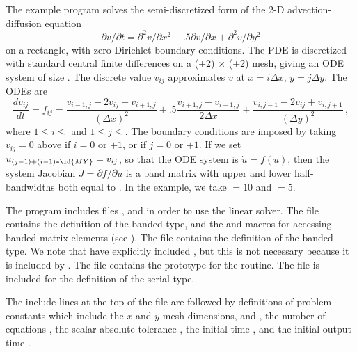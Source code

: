 The example program  solves the semi-discretized form of
the 2-D advection-diffusion equation
\vspace*{-.1in}
\begin{equation}
\label{eq:adeqn}
\partial v / \partial t = \partial^2 v / \partial x^2
  + .5 \partial v / \partial x + \partial^2 v / \partial y^2
\end{equation}
on a rectangle, with zero Dirichlet boundary conditions. The PDE is 
discretized with standard central finite differences on a 
(+2) $\times$ (+2) mesh, giving an ODE system of size
.  The discrete value $v_{ij}$ approximates $v$ at $x = i \Delta x$,
$y = j \Delta y$. The ODEs are
\begin{equation}
\label{eq:cdiff}
\frac{dv_{ij}}{dt} = f_{ij} =
         \frac{v_{i-1,j} - 2 v_{ij} + v_{i+1,j}}{(\Delta x)^2}
       + .5  \frac{v_{i+1,j} - v_{i-1,j}}{2 \Delta x}
       + \frac{v_{i,j-1} - 2 v_{ij} + v_{i,j+1}}{(\Delta y)^2} \, ,
\end{equation}
where $1 \leq i \leq $ and $1 \leq j \leq $.  The boundary
conditions are imposed by taking $v_{ij} = 0$ above if $i = 0$
or $ + 1$, or if $j = 0$ or $ + 1$. 
If we set $u_{(j-1)+(i-1)*\id{MY}} = v_{ij}$, so that the ODE system is
$\dot{u} = f(u)$, then the system Jacobian $J = \partial f / \partial u$ is
a band matrix with upper and lower half-bandwidths both equal to .
In the example, we take  $= 10$ and  $= 5$.

The  program includes files
,  and
 in order to use the {\sunlinsolband} linear
solver. The  file contains the definition of the
banded {\sunmatrix} type, and the  and
 macros for accessing banded matrix 
elements (see ).  The 
file contains the definition of the banded {\sunlinsol} type.  We note
that have explicitly included , but this is not
necessary because it is included by .  The
 file contains the prototype for the
 routine. The file  is
included for the definition of the serial  type.

The include lines at the top of the file are followed by definitions of
problem constants which include the $x$ and $y$ mesh dimensions,  and
, the number of equations , the scalar absolute tolerance
, the initial time , and the initial output time .

